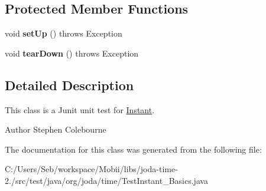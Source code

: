 \subsection*{Protected Member Functions}
\begin{DoxyCompactItemize}
\item 
\hypertarget{classorg_1_1joda_1_1time_1_1_test_instant___basics_a8e756b9b82d6846db3d8ad49949e9a97}{void {\bfseries set\-Up} ()  throws Exception }\label{classorg_1_1joda_1_1time_1_1_test_instant___basics_a8e756b9b82d6846db3d8ad49949e9a97}

\item 
\hypertarget{classorg_1_1joda_1_1time_1_1_test_instant___basics_ab8cef1a218d915a1afb0b83bb4050e4d}{void {\bfseries tear\-Down} ()  throws Exception }\label{classorg_1_1joda_1_1time_1_1_test_instant___basics_ab8cef1a218d915a1afb0b83bb4050e4d}

\end{DoxyCompactItemize}


\subsection{Detailed Description}
This class is a Junit unit test for \hyperlink{classorg_1_1joda_1_1time_1_1_instant}{Instant}.

\begin{DoxyAuthor}{Author}
Stephen Colebourne 
\end{DoxyAuthor}


The documentation for this class was generated from the following file\-:\begin{DoxyCompactItemize}
\item 
C\-:/\-Users/\-Seb/workspace/\-Mobii/libs/joda-\/time-\/2./src/test/java/org/joda/time/Test\-Instant\-\_\-\-Basics.\-java\end{DoxyCompactItemize}
